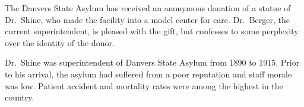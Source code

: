 
The Danvers State Asylum has received an anonymous donation of a
statue of Dr.~Shine, who made the facility into a model center for
care.  Dr.~Berger, the current superintendent, is pleased with the
gift, but confesses to some perplexity over the identity of the donor.

Dr.~Shine was superintendent of Danvers State Asylum from 1890 to
1915.  Prior to his arrival, the asylum had suffered from a poor
reputation and staff morale was low.  Patient accident and mortality
rates were among the highest in the country.
